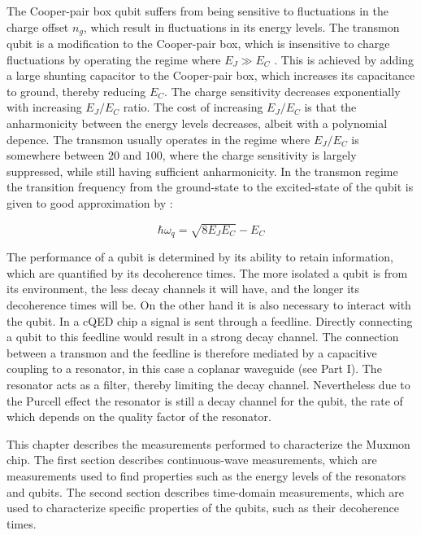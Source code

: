     The Cooper-pair box qubit suffers from being sensitive to fluctuations in the charge offset $n_g$, which result in fluctuations in its energy levels. The transmon qubit is a modification to the Cooper-pair box, which is insensitive to charge fluctuations by operating the regime where $E_J \gg E_C$ \cite{koch2007Transmon}. This is achieved by adding a large shunting capacitor to the Cooper-pair box, which increases its capacitance to ground, thereby reducing $E_C$. The charge sensitivity decreases exponentially with increasing $E_J/E_C$ ratio. The cost of increasing $E_J/E_C$ is that the anharmonicity between the energy levels decreases, albeit with a polynomial depence. The transmon usually operates in the regime where $E_J/E_C$ is somewhere between $20$ and $100$, where the charge sensitivity is largely suppressed, while still having sufficient anharmonicity. In the transmon regime the transition frequency from the ground-state to the excited-state of the qubit is given to good approximation by \cite[p.52]{Reed}:

    \begin{equation}
      \hbar \omega_q = \sqrt{8 E_J E_C} - E_C
      \label{eq:transmon frequency}
    \end{equation}

    The performance of a qubit is determined by its ability to retain information, which are quantified by its decoherence times. The more isolated a qubit is from its environment, the less decay channels it will have, and the longer its decoherence times will be. On the other hand it is also necessary to interact with the qubit. In a cQED chip a signal is sent through a feedline. Directly connecting a qubit to this feedline would result in a strong decay channel. The connection between a transmon and the feedline is therefore mediated by a capacitive coupling to a resonator, in this case a coplanar waveguide (see Part I). The resonator acts as a filter, thereby limiting the decay channel. Nevertheless due to the Purcell effect the resonator is still a decay channel for the qubit, the rate of which depends on the quality factor of the resonator.

    This chapter describes the measurements performed to characterize the Muxmon chip. The first section describes continuous-wave measurements, which are measurements used to find properties such as the energy levels of the resonators and qubits. The second section describes time-domain measurements, which are used to characterize specific properties of the qubits, such as their decoherence times.

